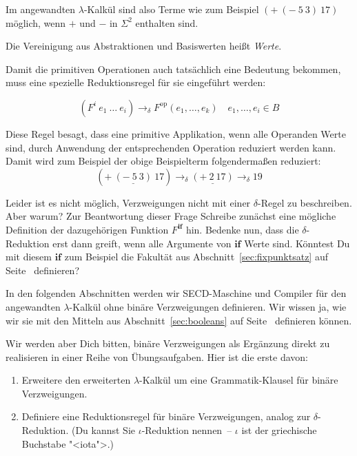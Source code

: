 %
Im angewandten $\lambda$-Kalkül sind also
Terme wie zum Beispiel $(+~(-~5~3)~17)$ möglich, wenn $+$ und $-$ in
$\Sigma^2$ enthalten sind.
%
\begin{definition}\label{def:wert-angewandt}
  Die Vereinigung aus Abstraktionen und
  Basiswerten heißt \textit{Werte}.
\end{definition}
%
Damit die primitiven Operationen auch tatsächlich eine Bedeutung
bekommen, muss eine spezielle Reduktionsregel für sie eingeführt
werden:
%
\begin{definition}
\begin{displaymath}
  (F^i~e_1~\ldots~e_i) \rightarrow_{\delta} F^{\textrm{op}}(e_1, \ldots, e_k)
  \quad e_1, \ldots, e_i \in B
\end{displaymath}
\end{definition}
%
Diese Regel besagt, dass eine primitive Applikation, wenn alle
Operanden Werte sind, durch Anwendung der entsprechenden Operation 
reduziert werden kann.  Damit wird zum Beispiel der
obige Beispielterm folgendermaßen reduziert:
%
\begin{displaymath}
  (+~\underline{(-~5~3)}~17) \rightarrow_{\delta} \underline{(+~2~17)} \rightarrow_{\delta} 19
\end{displaymath}
%
\begin{aufgabeinline}
  Leider ist es nicht möglich, Verzweigungen nicht mit einer
  $\delta$-Regel zu beschreiben.  Aber warum?  Zur Beantwortung dieser
  Frage Schreibe zunächst eine mögliche Definition der dazugehörigen
  Funktion $F^\mathbf{if}$ hin.  Bedenke nun, dass die
  $\delta$-Reduktion erst dann greift, wenn alle Argumente von
  $\mathbf{if}$ Werte sind.  Könntest Du mit diesem $\mathbf{if}$ zum
  Beispiel die Fakultät aus Abschnitt~\ref{sec:fixpunktsatz} auf
  Seite~\pageref{sec:fixpunktsatz} definieren?
\end{aufgabeinline}
%
In den folgenden Abschnitten werden wir SECD-Maschine und Compiler
für den angewandten $\lambda$-Kalkül ohne binäre Verzweigungen
definieren.  Wir wissen ja, wie wir sie mit den Mitteln aus
Abschnitt~\ref{sec:booleans} auf Seite~\pageref{sec:booleans}
definieren können.

Wir werden aber Dich bitten, binäre Verzweigungen als Ergänzung
direkt zu realisieren in einer Reihe von Übungsaufgaben.  Hier ist die
erste davon:
%
\begin{aufgabeinline}
  \begin{enumerate}
  \item Erweitere den erweiterten $\lambda$-Kalkül um eine
    Grammatik-Klausel für binäre Verzweigungen.
  \item Definiere eine Reduktionsregel für binäre Verzweigungen,
    analog zur $\delta$-Reduktion.  (Du kannst Sie $\iota$-Reduktion
    nennen~-- $\iota$ ist der griechische Buchstabe "<iota">.)
  \end{enumerate}
\end{aufgabeinline}

